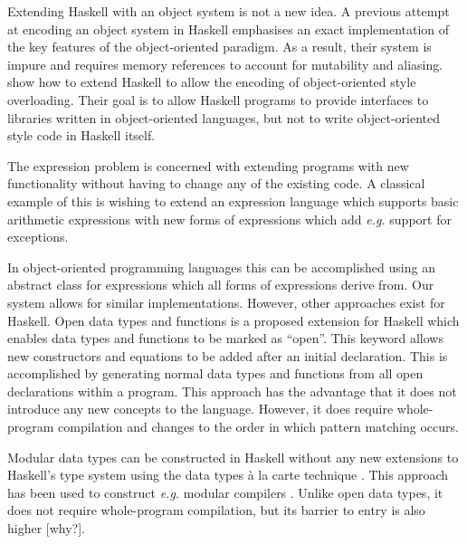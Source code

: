 \documentclass[runningheads,a4paper]{llncs}
\newcommand{\todo}[1]{[{\color{blue}#1}]}
\begin{document}
Extending Haskell with an object system is not a new idea. A previous attempt at encoding an object system in Haskell \cite{OOHaskell} emphasises an exact implementation of the key features of the object-oriented paradigm. As a result, their system is impure and requires memory references to account for mutability and aliasing. \cite{shields2001object} show how to extend Haskell to allow the encoding of object-oriented style overloading. Their goal is to allow Haskell programs to provide interfaces to libraries written in object-oriented languages, but not to write object-oriented style code in Haskell itself.


The expression problem \cite{wadler1998expression} is concerned with extending programs with new functionality without having to change any of the existing code. A classical example of this is wishing to extend an expression language which supports basic arithmetic expressions with new forms of expressions which add \emph{e.g.} support for exceptions.  

In object-oriented programming languages this can be accomplished using an abstract class for expressions which all forms of expressions derive from. Our system allows for similar implementations. However, other approaches exist for Haskell. Open data types and functions \cite{loh2006open} is a proposed extension for Haskell which enables data types and functions to be marked as ``open''. This keyword allows new constructors and equations to be added after an initial declaration. This is accomplished by generating normal data types and functions from all open declarations within a program. This approach has the advantage that it does not introduce any new concepts to the language. However, it does require whole-program compilation and changes to the order in which pattern matching occurs.

Modular data types can be constructed in Haskell without any new extensions to Haskell's type system using the data types \`a la carte technique \cite{swierstra2008data}. This approach has been used to construct \emph{e.g.} modular compilers \cite{day2012towards}. Unlike open data types, it does not require whole-program compilation, but its barrier to entry is also higher \todo{why?}. 
\end{document}
